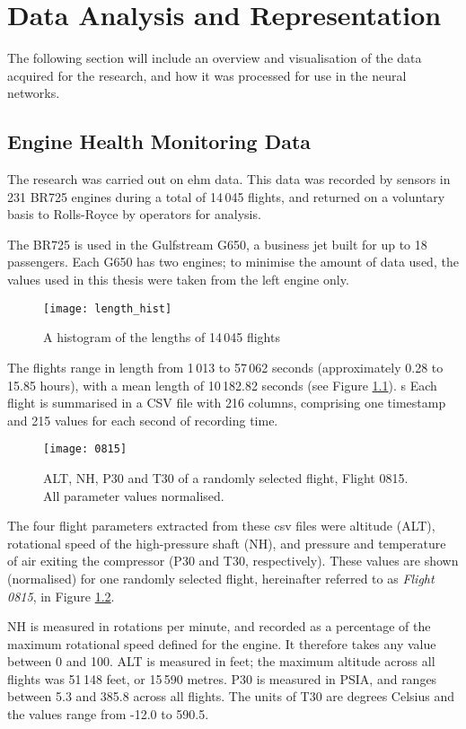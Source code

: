 \chapter{Data Analysis and Representation}
The following section will include an overview and visualisation of the data acquired for the research, and how it was processed for use in the neural networks.

\section{Engine Health Monitoring Data} \label{sec:ehm}
The research was carried out on \ac{ehm} data. This data was recorded by sensors in 231 BR725 engines during a total of 14\,045 flights, and returned on a voluntary basis to Rolls-Royce by operators for analysis.

The BR725 is used in the Gulfstream G650, a business jet built for up to 18 passengers. Each G650 has two engines; to minimise the amount of data used, the values used in this thesis were taken from the left engine only.

\begin{figure}
    \centering
    \texttt{[image: length\_hist]}
    \caption{\label{fig:flight_len} A histogram of the lengths of 14\,045 flights}
\end{figure}

The flights range in length from 1\,013 to 57\,062 seconds (approximately 0.28 to 15.85 hours), with a mean length of 10\,182.82 seconds (see Figure \ref{fig:flight_len}).
s
Each flight is summarised in a CSV file with 216 columns, comprising one timestamp and 215 values for each second of recording time.

\begin{figure}
    \centering
    \texttt{[image: 0815]}
    \caption{\label{fig:flight_example} ALT, NH, P30 and T30 of a randomly selected flight, Flight 0815. All parameter values normalised.}
\end{figure}

The four flight parameters extracted from these \ac{csv} files were altitude (ALT), rotational speed of the high-pressure shaft (NH), and pressure and temperature of air exiting the compressor (P30 and T30, respectively). These values are shown (normalised) for one randomly selected flight, hereinafter referred to as \textit{Flight 0815}, in Figure \ref{fig:flight_example}.

NH is measured in rotations per minute, and recorded as a percentage of the maximum rotational speed defined for the engine. It therefore takes any value between 0 and 100. ALT is measured in feet; the maximum altitude across all flights was 51\,148 feet, or 15\,590 metres. P30 is measured in PSIA, and ranges between 5.3 and 385.8 across all flights. The units of T30 are degrees Celsius and the values range from -12.0 to 590.5.

